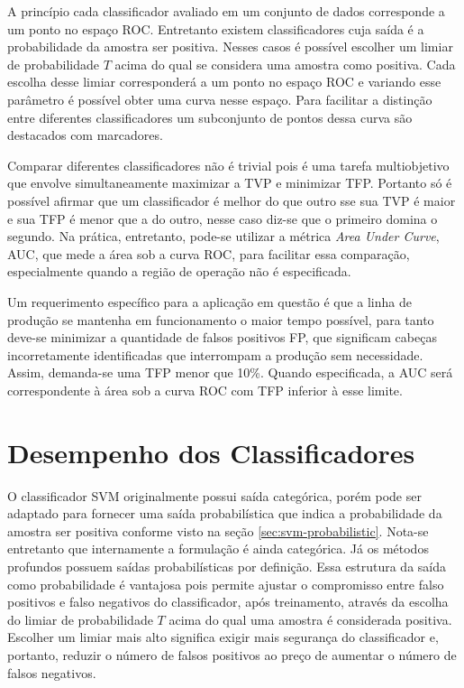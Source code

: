 A princípio cada classificador avaliado em um conjunto de dados corresponde a um ponto no espaço ROC. Entretanto existem classificadores cuja saída é a probabilidade da amostra ser positiva. Nesses casos é possível escolher um limiar de probabilidade $T$ acima do qual se considera uma amostra como positiva. Cada escolha desse limiar corresponderá a um ponto no espaço ROC e variando esse parâmetro é possível obter uma curva nesse espaço. Para facilitar a distinção entre diferentes classificadores um subconjunto de pontos dessa curva são destacados com marcadores.

Comparar diferentes classificadores não é trivial pois é uma tarefa multiobjetivo que envolve simultaneamente maximizar a TVP e minimizar TFP. Portanto só é possível afirmar que um classificador é melhor do que outro sse sua TVP é maior e sua TFP é menor que a do outro, nesse caso diz-se que o primeiro domina o segundo. Na prática, entretanto, pode-se utilizar a métrica \textit{Area Under Curve}, AUC, que mede a área sob a curva ROC, para facilitar essa comparação, especialmente quando a região de operação não é especificada.

Um requerimento específico para a aplicação em questão é que a linha de produção se mantenha em funcionamento o maior tempo possível, para tanto deve-se minimizar a quantidade de falsos positivos FP, que significam cabeças incorretamente identificadas que interrompam a produção sem necessidade. Assim, demanda-se uma TFP menor que 10\%. Quando especificada, a AUC será correspondente à área sob a curva ROC com TFP inferior à esse limite.

\section{Desempenho dos Classificadores}
\label{sec:resultados-classificadores}
O classificador SVM originalmente possui saída categórica, porém pode ser adaptado para fornecer uma saída probabilística que indica a probabilidade da amostra ser positiva conforme visto na seção \ref{sec:svm-probabilistic}. Nota-se entretanto que internamente a formulação é ainda categórica. Já os métodos profundos possuem saídas probabilísticas por definição. Essa estrutura da saída como probabilidade é vantajosa pois permite ajustar o compromisso entre falso positivos e falso negativos do classificador, após treinamento, através da escolha do limiar de probabilidade $T$ acima do qual uma amostra é considerada positiva. Escolher um limiar mais alto significa exigir mais segurança do classificador e, portanto, reduzir o número de falsos positivos ao preço de aumentar o número de falsos negativos.

